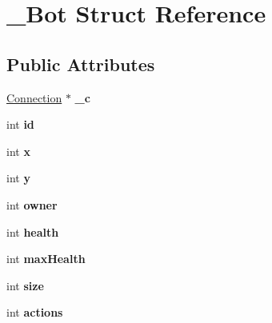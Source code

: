 \hypertarget{struct__Bot}{
\section{\_\-Bot Struct Reference}
\label{struct__Bot}
}
\subsection*{Public Attributes}
\begin{DoxyCompactItemize}
\item 
\hypertarget{struct__Bot_a8eace064ca320a504ebd4346a46e24ba}{
\hyperlink{structConnection}{Connection} $\ast$ {\bfseries \_\-c}}
\label{struct__Bot_a8eace064ca320a504ebd4346a46e24ba}

\item 
\hypertarget{struct__Bot_a210750792cc706e75346904a1e4fcba9}{
int {\bfseries id}}
\label{struct__Bot_a210750792cc706e75346904a1e4fcba9}

\item 
\hypertarget{struct__Bot_a4f57cab815e10b59bd35fd22eb6c4ae0}{
int {\bfseries x}}
\label{struct__Bot_a4f57cab815e10b59bd35fd22eb6c4ae0}

\item 
\hypertarget{struct__Bot_af97ef8695aee6f7de31a5b3e9e5efede}{
int {\bfseries y}}
\label{struct__Bot_af97ef8695aee6f7de31a5b3e9e5efede}

\item 
\hypertarget{struct__Bot_ac9e9133a82f52ac8feeb21ef50378ae1}{
int {\bfseries owner}}
\label{struct__Bot_ac9e9133a82f52ac8feeb21ef50378ae1}

\item 
\hypertarget{struct__Bot_a2daffc482e65fd50c8e405b416ad7691}{
int {\bfseries health}}
\label{struct__Bot_a2daffc482e65fd50c8e405b416ad7691}

\item 
\hypertarget{struct__Bot_ad0b78f544be40a0ce920c1be6418528e}{
int {\bfseries maxHealth}}
\label{struct__Bot_ad0b78f544be40a0ce920c1be6418528e}

\item 
\hypertarget{struct__Bot_ac536a158e666e25c3616337ca3200720}{
int {\bfseries size}}
\label{struct__Bot_ac536a158e666e25c3616337ca3200720}

\item 
\hypertarget{struct__Bot_a8e5e38855bd71b564f5f549474601c02}{
int {\bfseries actions}}
\label{struct__Bot_a8e5e38855bd71b564f5f549474601c02}


\end{DoxyCompactItemize}
